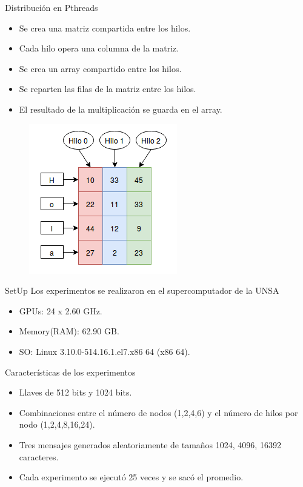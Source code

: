 \documentclass{beamer}
\begin{document}
\begin{frame}{Distribución en Pthreads}
  \begin{itemize}
   \item Se crea una matriz compartida entre los hilos.
   \item Cada hilo opera una columna de la matriz.
   \item Se crea un array compartido entre los hilos.
   \item Se reparten las filas de la matriz entre los hilos.
   \item El resultado de la multiplicación se guarda en el array.
  \end{itemize}
\end{frame}


\begin{frame}
 \begin{figure}
  \centering
  \includegraphics[scale = 0.6]{4.png}
 \end{figure}
\end{frame}

\begin{frame}{SetUp}
 Los experimentos se realizaron en el supercomputador de la UNSA
 \begin{itemize}
  \item GPUs: 24 x 2.60 GHz.
  \item Memory(RAM): 62.90 GB.
  \item SO: Linux 3.10.0-514.16.1.el7.x86 64 (x86 64).
 \end{itemize}
\end{frame}

\begin{frame}{Características de los experimentos}
  \begin{itemize}
   \item Llaves de 512 bits y 1024 bits.
   \item Combinaciones entre el número de nodos (1,2,4,6) y el número
    de hilos por nodo (1,2,4,8,16,24).
    \item Tres mensajes generados aleatoriamente de tamaños 1024, 4096, 16392 caracteres.
   \item Cada experimento se ejecutó 25 veces y se sacó el promedio.
  \end{itemize} 
\end{frame}
\end{document}
